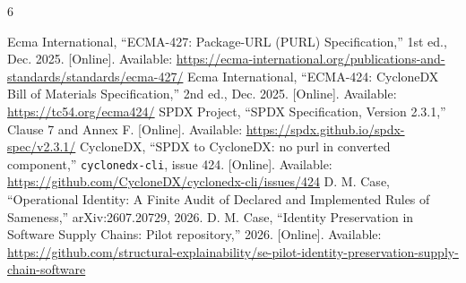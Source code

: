 \documentclass[conference,10pt]{IEEEtran}
\begin{document}
\begin{thebibliography}{6}

   Ecma International,
  ``ECMA-427: Package-URL (PURL) Specification,''
  1st ed., Dec. 2025. [Online]. Available:
  \url{https://ecma-international.org/publications-and-standards/standards/ecma-427/}
   Ecma International,
  ``ECMA-424: CycloneDX Bill of Materials Specification,''
  2nd ed., Dec. 2025. [Online]. Available:
  \url{https://tc54.org/ecma424/}
   SPDX Project, ``SPDX Specification, Version 2.3.1,''
  Clause 7 and Annex F. [Online]. Available:
  \url{https://spdx.github.io/spdx-spec/v2.3.1/}
   CycloneDX,
  ``SPDX to CycloneDX: no purl in converted component,''
  \texttt{cyclonedx-cli}, issue 424. [Online]. Available:
  \url{https://github.com/CycloneDX/cyclonedx-cli/issues/424}
   D. M. Case,
  ``Operational Identity: A Finite Audit of Declared and Implemented Rules of Sameness,''
  arXiv:2607.20729, 2026.
   D. M. Case, ``Identity Preservation in Software Supply Chains: Pilot repository,''
  2026. [Online]. Available:
  \url{https://github.com/structural-explainability/se-pilot-identity-preservation-supply-chain-software}

\end{thebibliography}
\end{document}
